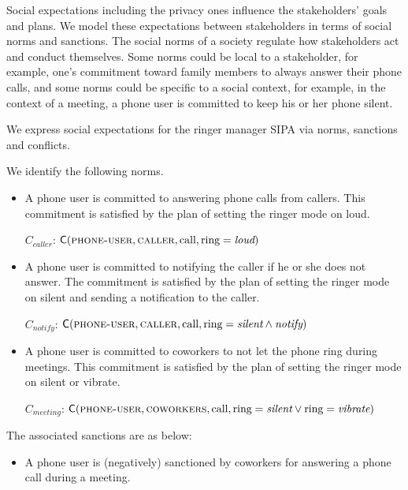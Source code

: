 Social expectations including the privacy ones influence the
stakeholders' goals and plans. We model these expectations between
stakeholders in terms of social norms and sanctions. The social norms of
a society regulate how stakeholders act and conduct themselves. Some
norms could be local to a stakeholder, for example, one's commitment
toward family members to always answer their phone calls, and some norms
could be specific to a social context, for example, in the context of a
meeting, a phone user is committed to keep his or her phone silent.

We express social expectations for the ringer manager SIPA via norms,
sanctions and conflicts.
\begin{description}[leftmargin=1em]
\item[Norms.] We identify the following norms.
  \begin{itemize}[leftmargin=1em]
  \item A phone user is committed to answering phone calls from
  callers. This commitment is satisfied by the plan of setting the 
  ringer mode on loud.

  $C_{caller}$: $\mathsf{C}(\textsc{phone-user},\textsc{caller}, \text{call}, \text{ring}=\textit{loud})$

  \item A phone user is committed to notifying the caller if he or she does
  not answer. The commitment is satisfied by the plan of setting the
  ringer mode on silent and sending a notification to the caller.
  
  $C_{notify}$: $\mathsf{C}(\textsc{phone-user},\textsc{caller}, \text{call},\\ 
  \text{ring}= \textit{silent}   \land \textit{notify})$
    
  \item A phone user is committed to coworkers to not let the phone ring 
  during meetings.
  This commitment is satisfied by the plan of setting the ringer mode on 
  silent or vibrate. 

  $C_{meeting}$: $\mathsf{C}(\textsc{phone-user},\textsc{coworkers}, \text{call},\\ 
  \text{ring}= \textit{silent} \lor \text{ring} = \textit{vibrate})$
  \end{itemize}
  
\item[Sanctions.] The associated sanctions are as below: 
  \begin{itemize}[leftmargin=1em]
  \item A phone user is (negatively) sanctioned by coworkers for 
  answering a phone call during a meeting. 
  

\end{itemize}
\end{description}
